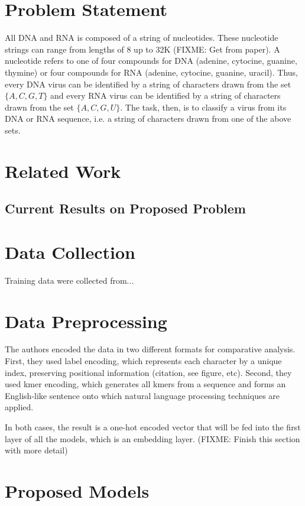 \documentclass[journal]{IEEEtran}
\begin{document}
\section{Problem Statement}
All DNA and RNA is composed of a string of nucleotides. These nucleotide strings
can range from lengths of 8 up to 32K (FIXME: Get from paper). A nucleotide refers to one of
four compounds for DNA (adenine, cytocine, guanine, thymine) or four compounds for RNA
(adenine, cytocine, guanine, uracil). Thus, every DNA virus can be identified by a string of
characters drawn from the set $\{A, C, G, T\}$ and every RNA virus can be identified by a string
of characters drawn from the set $\{A, C, G, U\}$. The task, then, is to classify a virus 
from its DNA or RNA sequence, i.e. a string of characters drawn from one of the above sets.

\section{Related Work}
\lipsum[1] %

\subsection{Current Results on Proposed Problem}
\lipsum[1] %

\section{Data Collection}
Training data were collected from...

\section{Data Preprocessing}
The authors encoded the data in two different formats for comparative analysis.
First, they used label encoding, which represents each character by a unique index,
preserving positional information (citation, see figure, etc).
Second, they used kmer encoding, which generates all kmers from a sequence and forms an
English-like sentence onto which natural language processing techniques are applied.

In both cases, the result is a one-hot encoded vector that will be fed into the first layer
of all the models, which is an embedding layer. (FIXME: Finish this section with more detail)

\section{Proposed Models}
\lipsum[1] %
\end{document}
